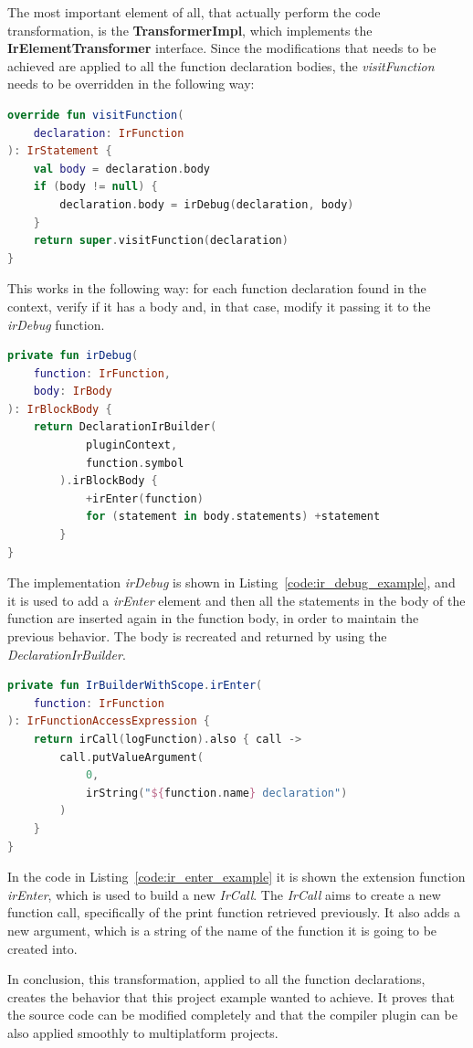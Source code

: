 The most important element of all, that actually perform the code transformation, is the \textbf{TransformerImpl}, which implements the \textbf{IrElementTransformer} interface.\newline
Since the modifications that needs to be achieved are applied to all the function declaration bodies, the \textit{visitFunction}  needs to be overridden in the following way:
\begin{lstlisting}[caption={Example of \textit{visitFunction} implementation of the transformer, used to visit all the function declarations}, captionpos=b, language=Kotlin, label={code:visit_function_declaration_example}]
override fun visitFunction(
    declaration: IrFunction
): IrStatement {
    val body = declaration.body
    if (body != null) {
        declaration.body = irDebug(declaration, body)
    }
    return super.visitFunction(declaration)
}
\end{lstlisting}
This works in the following way: for each function declaration found in the context, verify if it has a body and, in that case, modify it passing it to the \textit{irDebug} function.
\begin{lstlisting}[caption={Example of implementation of a function that adds a new element into the function body}, captionpos=b, language=Kotlin, label={code:ir_debug_example}]
private fun irDebug(
    function: IrFunction,
    body: IrBody
): IrBlockBody {
    return DeclarationIrBuilder(
            pluginContext,
            function.symbol
        ).irBlockBody {
            +irEnter(function)
            for (statement in body.statements) +statement
        }
}
\end{lstlisting}
The implementation \textit{irDebug} is shown in Listing~\ref{code:ir_debug_example}, and it is used to add a \textit{irEnter} element and then all the statements in the body of the function are inserted again in the function body, in order to maintain the previous behavior. The body is recreated and returned by using the \textit{DeclarationIrBuilder}.

\begin{lstlisting}[caption={Example of creation of a new function call and adding to it arguments}, captionpos=b, language=Kotlin, label={code:ir_enter_example}]
private fun IrBuilderWithScope.irEnter(
    function: IrFunction
): IrFunctionAccessExpression {
    return irCall(logFunction).also { call ->
        call.putValueArgument(
            0,
            irString("${function.name} declaration")
        )
    }
}
\end{lstlisting}
In the code in Listing~\ref{code:ir_enter_example} it is shown the extension function \textit{irEnter}, which is used to build a new \textit{IrCall}. The \textit{IrCall} aims to create a new function call, specifically of the print function retrieved previously. It also adds a new argument, which is a string of the name of the function it is going to be created into.

In conclusion, this transformation, applied to all the function declarations, creates the behavior that this project example wanted to achieve.\newline
It proves that the source code can be modified completely and that the compiler plugin can be also applied smoothly to multiplatform projects.